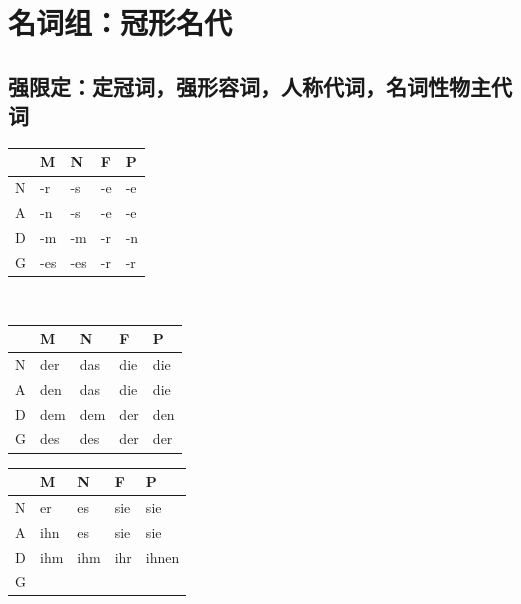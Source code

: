 \chapter{名词组：冠形名代}
\section{强限定：定冠词，强形容词，人称代词，名词性物主代词}
\begin{tabular}{|M{2em}|M{2em}|M{2em}|M{2em}|M{2em}|}
    \hline
      & M   & N   & F  & P  \\
    \hline
    N & -r  & -s  & -e & -e \\
    \hline
    A & -n  & -s  & -e & -e \\
    \hline
    D & -m  & -m  & -r & -n \\
    \hline
    G & -es & -es & -r & -r \\
    \hline
\end{tabular} \\

\begin{tabular}{|M{2em}|M{2em}|M{2em}|M{2em}|M{2em}|}
    \hline
      & M   & N   & F   & P   \\
    \hline
    N & der & das & die & die \\
    \hline
    A & den & das & die & die \\
    \hline
    D & dem & dem & der & den \\
    \hline
    G & des & des & der & der \\
    \hline
\end{tabular}
\begin{tabular}{|M{2em}|M{2em}|M{2em}|M{2em}|M{2em}|}
    \hline
      & M   & N   & F   & P     \\
    \hline
    N & er  & es  & sie & sie   \\
    \hline
    A & ihn & es  & sie & sie   \\
    \hline
    D & ihm & ihm & ihr & ihnen \\
    \hline
    G &     &     &     &       \\
    \hline
\end{tabular} \\

